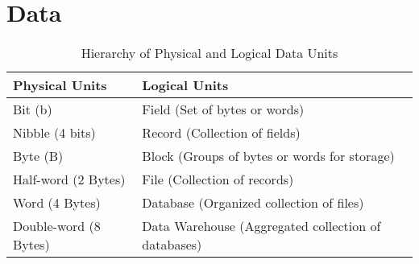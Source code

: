 \section*{Data}

\begin{table}[ht]
	\centering
	\caption{Hierarchy of Physical and Logical Data Units}
	\label{tab:physical_logical_data_units}
	\begin{tabular*}{\textwidth}{@{\extracolsep{\fill}}ll}
		\toprule
		Physical Units & Logical Units \\
		\midrule
		Bit (b) & Field (Set of bytes or words) \\
		Nibble (4 bits) & Record (Collection of fields) \\
		Byte (B) & Block (Groups of bytes or words for storage) \\
		Half-word (2 Bytes) & File (Collection of records) \\
		Word (4 Bytes) & Database (Organized collection of files) \\
		Double-word (8 Bytes) & Data Warehouse (Aggregated collection of databases) \\
		\bottomrule
	\end{tabular*}
\end{table}


